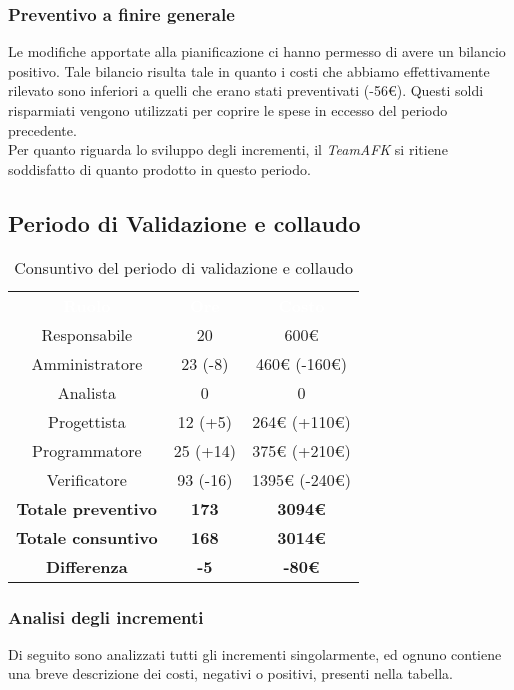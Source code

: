 \subsubsection{Preventivo a finire generale}
Le modifiche apportate alla pianificazione ci hanno permesso di avere un
bilancio positivo. Tale bilancio risulta tale in quanto i costi che abbiamo effettivamente rilevato sono inferiori a quelli che erano stati preventivati (-56€). Questi soldi risparmiati vengono utilizzati per coprire le spese in eccesso del periodo precedente.\\
Per quanto riguarda lo sviluppo degli incrementi, il \textit{TeamAFK} si ritiene soddisfatto di quanto prodotto in questo periodo.


\subsection{Periodo di Validazione e collaudo}
\label{tab:pb}
\begin{table}[H]
\centering\renewcommand{\arraystretch}{1.5}
\caption{Consuntivo del periodo di validazione e collaudo}
\vspace{0.2cm}
\begin{tabular}{ c c c }
\rowcolor{redafk}
\textcolor{white}{\textbf{Ruolo}} & \textcolor{white}{\textbf{Ore}} &
\textcolor{white}{\textbf{Costo}}  \\
Responsabile 	& 20 & 600€ \\
Amministratore 	&  23 (-8)	& 460€ (-160€) \\
Analista 		& 0  & 0  \\
Progettista		& 12 (+5)  & 264€ (+110€) \\
Programmatore	& 25 (+14) & 375€ (+210€) \\
Verificatore 	& 93 (-16) &  1395€ (-240€) \\
\textbf{Totale preventivo} & \textbf{173} & \textbf{3094€} \\
\textbf{Totale consuntivo} & \textbf{168} & \textbf{3014€} \\
\rowcolor{lastrowcolor}
\textbf{Differenza} & \textbf{-5} & \textbf{-80€} \\
\end{tabular}
\end{table}

\subsubsection{Analisi degli incrementi}
Di seguito sono analizzati tutti gli incrementi singolarmente, ed ognuno contiene una breve descrizione dei costi, negativi o positivi, presenti nella tabella.

